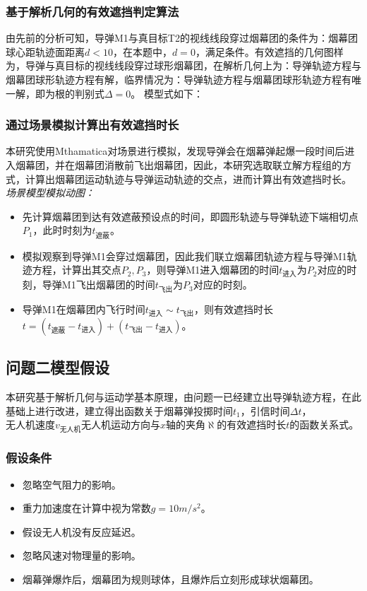 \documentclass{article}
\begin{document}
\subsubsection{基于解析几何的有效遮挡判定算法}

由先前的分析可知，导弹M1与真目标T2的视线线段穿过烟幕团的条件为：烟幕团球心距轨迹面距离$d<10$，在本题中，$d = 0$，满足条件。有效遮挡的几何图样为，导弹与真目标的视线线段穿过球形烟幕团，在解析几何上为：导弹轨迹方程与烟幕团球形轨迹方程有解，临界情况为：导弹轨迹方程与烟幕团球形轨迹方程有唯一解，即为根的判别式$\Delta  = 0$。
模型式如下：
\subsubsection{通过场景模拟计算出有效遮挡时长}
本研究使用Mthamatica对场景进行模拟，发现导弹会在烟幕弹起爆一段时间后进入烟幕团，并在烟幕团消散前飞出烟幕团，因此，本研究选取联立解方程组的方式，计算出烟幕团运动轨迹与导弹运动轨迹的交点，进而计算出有效遮挡时长。
\textit{场景模型模拟动图：}

\begin{itemize}
    \item 先计算烟幕团到达有效遮蔽预设点的时间，即圆形轨迹与导弹轨迹下端相切点$P_1$，此时时刻为$t_\text{遮蔽}$。
    \item 模拟观察到导弹M1会穿过烟幕团，因此我们联立烟幕团轨迹方程与导弹M1轨迹方程，计算出其交点$P_2,P_3$，则导弹M1进入烟幕团的时间$t_{\text{进入}}$为$P_2$对应的时刻，导弹M1飞出烟幕团的时间$t_{\text{飞出}}$为$P_3$对应的时刻。
    \item 导弹M1在烟幕团内飞行时间$t_{\text{进入}} \sim t_{\text{飞出}}$，则有效遮挡时长$t =(t_\text{遮蔽}- t_\text{进入}) + (t_{\text{飞出}} - t_{\text{进入}})$。
\end{itemize}
\subsection{问题二模型假设}
本研究基于解析几何与运动学基本原理，由问题一已经建立出导弹轨迹方程，在此基础上进行改进，建立得出函数关于烟幕弹投掷时间$t_1$，引信时间$\Delta t$，$无人机速度 v_\text{无人机}$$无人机运动方向与x轴的夹角\aleph$的有效遮挡时长$t$的函数关系式。


\subsubsection{假设条件}
\begin{itemize}
    \item 忽略空气阻力的影响。
    \item 重力加速度在计算中视为常数$g = 10m/s^2$。
    \item 假设无人机没有反应延迟。
    \item 忽略风速对物理量的影响。
    \item 烟幕弹爆炸后，烟幕团为规则球体，且爆炸后立刻形成球状烟幕团。
\end{itemize}
\end{document}
